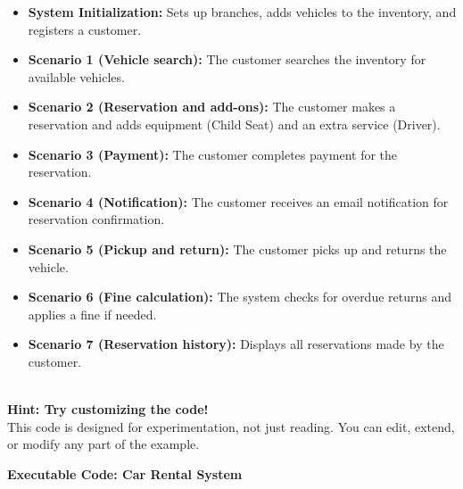 \begin{itemize}
\item
\protect{}\label{-RmP4oRpNZCcygA4L33uw}
\textbf{System Initialization:} Sets up branches, adds vehicles to the inventory, and registers a customer.
\item
\protect{}\label{m-w628LnnaqUyrkLq8yor}
\textbf{Scenario 1 (Vehicle search):} The customer searches the inventory for available vehicles.
\item
\protect{}\label{CNjPKhgeF-M4D4AcaRuCK}
\textbf{Scenario 2 (Reservation and add-ons):} The customer makes a reservation and adds equipment (Child Seat) and an extra service (Driver).
\item
\protect{}\label{UbXFpi73vyvvrZGe_hRRN}
\textbf{Scenario 3 (Payment):} The customer completes payment for the reservation.
\item
\protect{}\label{Rg1ko2Io7TBJS8MURSnCC}
\textbf{Scenario 4 (Notification):} The customer receives an email notification for reservation confirmation.
\item
\protect{}\label{qVOV1sRCQgqK90GncN8ui}
\textbf{Scenario 5 (Pickup and return):} The customer picks up and returns the vehicle.
\item
\protect{}\label{PzNXDz0ZRZ-oTNykKD9r9}
\textbf{Scenario 6 (Fine calculation):} The system checks for overdue returns and applies a fine if needed.
\item
\protect{}\label{80FfNAcR-g-NMbUJbES-t}
\textbf{Scenario 7 (Reservation history):} Displays all reservations made by the customer.
\end{itemize}
\\
\textbf{Hint: Try customizing the code!}
\\
This code is designed for experimentation, not just reading. You can edit, extend, or modify any part of the example.

\textbf{Executable Code: Car Rental System}

